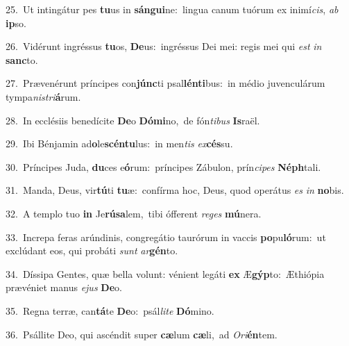 {\numbfont\textcolor{\numbcolor}{25.}}~Ut intingátur pes \textbf{tu}\-us in \textbf{sán}\-\textbf{gui}ne:~\star lingua canum tuórum ex inimí\-\textit{cis}\-, \textit{ab} \textbf{ip}\-so.\par
{\numbfont\textcolor{\numbcolor}{26.}}~Vidérunt ingréssus \textbf{tu}\-os, \textbf{De}\-us:~\star ingréssus Dei mei: regis mei qui \textit{est} \textit{in} \textbf{sanc}\-to.\par
{\numbfont\textcolor{\numbcolor}{27.}}~Prævenérunt príncipes con\-\textbf{júnc}\-ti psal\-\textbf{lén}\-\textbf{ti}bus:~\star in médio juvenculárum tympa\-\textit{nis}\-\textit{tri}\textbf{á}rum.\par
{\numbfont\textcolor{\numbcolor}{28.}}~In ecclésiis benedícite \textbf{De}\-o \textbf{Dó}\-\textbf{mi}no,~\star de fón\-\textit{ti}\-\textit{bus} \textbf{Is}\-raël.\par
{\numbfont\textcolor{\numbcolor}{29.}}~Ibi Bénjamin ad\-\textbf{o}\-le\-\textbf{scén}\-\textbf{tu}lus:~\star in men\textit{tis} \textit{ex}\-\textbf{cés}su.\par
{\numbfont\textcolor{\numbcolor}{30.}}~Príncipes Juda, \textbf{du}\-ces e\-\textbf{ó}\-rum:~\star príncipes Zábulon, prín\-\textit{ci}\-\textit{pes} \textbf{Néph}\-tali.\par
{\numbfont\textcolor{\numbcolor}{31.}}~Manda, Deus, vir\-\textbf{tú}\-ti \textbf{tu}\-æ:~\star confírma hoc, Deus, quod operátus \textit{es} \textit{in} \textbf{no}\-bis.\par
{\numbfont\textcolor{\numbcolor}{32.}}~A templo tuo \textbf{in} Je\-\textbf{rú}\-\textbf{sa}lem,~\star tibi ófferent \textit{re}\-\textit{ges} \textbf{mú}\-nera.\par
{\numbfont\textcolor{\numbcolor}{33.}}~Increpa feras arúndinis, congregátio taurórum in vaccis \textbf{po}\-pu\-\textbf{ló}\-rum:~\star ut exclúdant eos, qui probáti \textit{sunt} \textit{ar}\-\textbf{gén}to.\par
{\numbfont\textcolor{\numbcolor}{34.}}~Díssipa Gentes, quæ bella volunt: vénient legáti \textbf{ex} Æ\-\textbf{gýp}\-to:~\star Æthiópia prævéniet manus \textit{e}\-\textit{jus} \textbf{De}\-o.\par
{\numbfont\textcolor{\numbcolor}{35.}}~Regna terræ, can\-\textbf{tá}\-te \textbf{De}\-o:~\star psál\-\textit{li}\-\textit{te} \textbf{Dó}\-mino.\par
{\numbfont\textcolor{\numbcolor}{36.}}~Psállite Deo, qui ascéndit super \textbf{cæ}\-lum \textbf{cæ}\-li,~\star ad \textit{O}\-\textit{ri}\textbf{én}tem.\par
